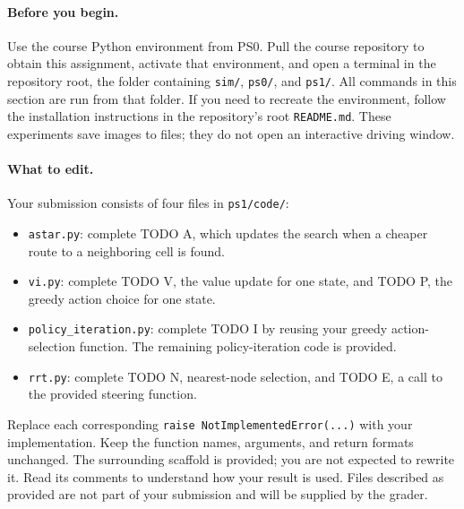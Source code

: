 \documentclass[11pt]{article}
\begin{document}
\paragraph{Before you begin.}
Use the course Python environment from PS0. Pull the course repository
to obtain this assignment, activate that environment, and open a terminal
in the repository root, the folder containing \texttt{sim/},
\texttt{ps0/}, and \texttt{ps1/}. All commands in this section are run
from that folder. If you need to recreate the environment, follow the
installation instructions in the repository's root \texttt{README.md}.
These experiments save images to files; they do not open an interactive
driving window.

\paragraph{What to edit.}
Your submission consists of four files in \texttt{ps1/code/}:
\begin{itemize}
\item \texttt{astar.py}: complete TODO A, which updates the search when
a cheaper route to a neighboring cell is found.
\item \texttt{vi.py}: complete TODO V, the value update for one state,
and TODO P, the greedy action choice for one state.
\item \texttt{policy\_iteration.py}: complete TODO I by reusing your
greedy action-selection function. The remaining policy-iteration code is provided.
\item \texttt{rrt.py}: complete TODO N, nearest-node selection, and
TODO E, a call to the provided steering function.
\end{itemize}
Replace each corresponding \texttt{raise NotImplementedError(...)} with
your implementation. Keep the function names, arguments, and return
formats unchanged. The surrounding scaffold is provided; you are not
expected to rewrite it. Read its comments to understand how your result
is used. Files described as provided are not part of your submission and
will be supplied by the grader.
\end{document}
